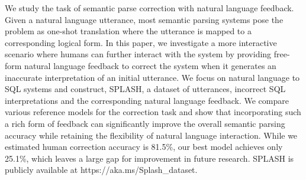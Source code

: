 We study the task of semantic parse correction with natural language feedback. Given a natural language utterance, most semantic parsing systems pose the problem as one-shot translation where the utterance is mapped to a corresponding logical form. In this paper, we investigate a more interactive scenario where humans can further interact with the system by providing free-form natural language feedback to correct the system when it generates an inaccurate interpretation of an initial utterance. We focus on natural language to SQL systems and construct, SPLASH, a dataset of utterances, incorrect SQL interpretations and the corresponding natural language feedback. We compare various reference models for the correction task and show that incorporating such a rich form of feedback can significantly improve the overall semantic parsing accuracy while retaining the flexibility of natural language interaction. While we estimated human correction accuracy is 81.5\%, our best model achieves only 25.1\%,  which leaves a large gap for improvement in future research. SPLASH is publicly available at https://aka.ms/Splash\_dataset.
